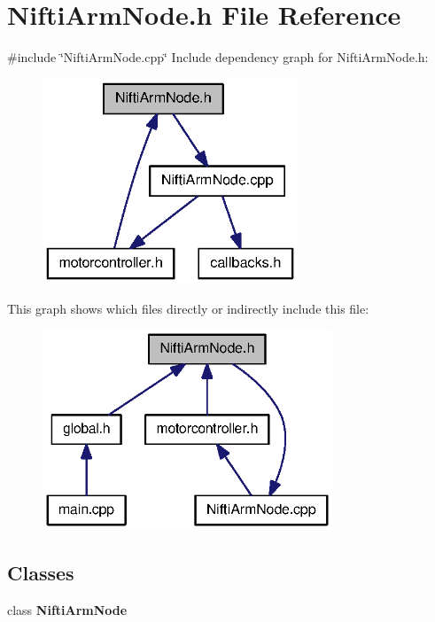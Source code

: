 \section{\-Nifti\-Arm\-Node.\-h \-File \-Reference}
\label{NiftiArmNode_8h}
{\ttfamily \#include \char`\"{}\-Nifti\-Arm\-Node.\-cpp\char`\"{}}\*
\-Include dependency graph for \-Nifti\-Arm\-Node.\-h\-:
\nopagebreak
\begin{figure}[H]
\begin{center}
\leavevmode
\includegraphics[width=216pt]{NiftiArmNode_8h__incl}
\end{center}
\end{figure}
\-This graph shows which files directly or indirectly include this file\-:
\nopagebreak
\begin{figure}[H]
\begin{center}
\leavevmode
\includegraphics[width=245pt]{NiftiArmNode_8h__dep__incl}
\end{center}
\end{figure}
\subsection*{\-Classes}
\begin{DoxyCompactItemize}
\item 
class {\bf \-Nifti\-Arm\-Node}
\end{DoxyCompactItemize}
